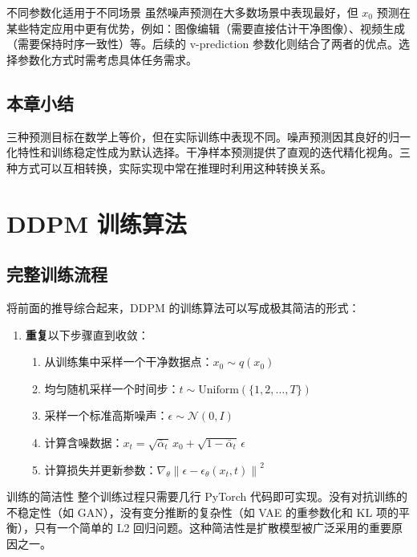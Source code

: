 \documentclass[a4paper]{article}
\begin{document}
\begin{warningbox}{不同参数化适用于不同场景}
虽然噪声预测在大多数场景中表现最好，但 $x_0$ 预测在某些特定应用中更有优势，例如：图像编辑（需要直接估计干净图像）、视频生成（需要保持时序一致性）等。后续的 v-prediction 参数化则结合了两者的优点。选择参数化方式时需考虑具体任务需求。
\end{warningbox}

\subsection{本章小结}

三种预测目标在数学上等价，但在实际训练中表现不同。噪声预测因其良好的归一化特性和训练稳定性成为默认选择。干净样本预测提供了直观的迭代精化视角。三种方式可以互相转换，实际实现中常在推理时利用这种转换关系。


\section{DDPM 训练算法}

\subsection{完整训练流程}

将前面的推导综合起来，DDPM 的训练算法可以写成极其简洁的形式：

\begin{enumerate}
    \item \textbf{重复}以下步骤直到收敛：
    \begin{enumerate}
        \item 从训练集中采样一个干净数据点：$x_0 \sim q(x_0)$
        \item 均匀随机采样一个时间步：$t \sim \text{Uniform}(\{1, 2, \dots, T\})$
        \item 采样一个标准高斯噪声：$\epsilon \sim \mathcal{N}(0, I)$
        \item 计算含噪数据：$x_t = \sqrt{\bar{\alpha}_t}\, x_0 + \sqrt{1 - \bar{\alpha}_t}\, \epsilon$
        \item 计算损失并更新参数：$\nabla_\theta \left\| \epsilon - \epsilon_\theta(x_t, t) \right\|^2$
    \end{enumerate}
\end{enumerate}

\begin{knowledgebox}{训练的简洁性}
整个训练过程只需要几行 PyTorch 代码即可实现。没有对抗训练的不稳定性（如 GAN），没有变分推断的复杂性（如 VAE 的重参数化和 KL 项的平衡），只有一个简单的 L2 回归问题。这种简洁性是扩散模型被广泛采用的重要原因之一。
\end{knowledgebox}
\end{document}
